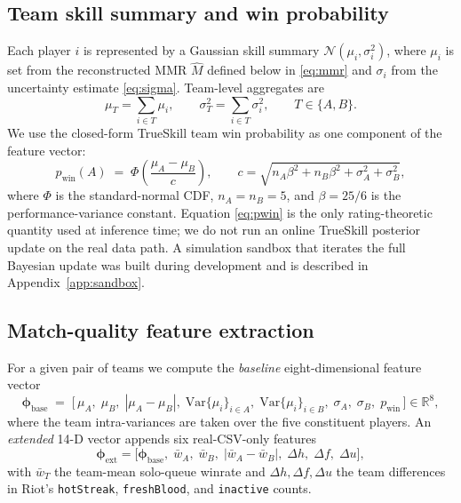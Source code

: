 \documentclass{article}
\begin{document}
\subsection{Team skill summary and win probability}
\label{sec:rating}
Each player $i$ is represented by a Gaussian skill summary $\mathcal{N}(\mu_i,
\sigma_i^2)$, where $\mu_i$ is set from the reconstructed MMR
$\widehat{M}$ defined below in \eqref{eq:mmr} and $\sigma_i$ from the
uncertainty estimate \eqref{eq:sigma}. Team-level aggregates are
\begin{equation}
\mu_T = \sum_{i \in T} \mu_i, \qquad
\sigma_T^2 = \sum_{i \in T} \sigma_i^2, \qquad T \in \{A, B\}.
\label{eq:team-agg}
\end{equation}
We use the closed-form TrueSkill team win probability as one component of
the feature vector:
\begin{equation}
p_{\text{win}}(A) \;=\; \Phi\!\left(\frac{\mu_A - \mu_B}{c}\right),
\qquad c = \sqrt{n_A \beta^2 + n_B \beta^2 + \sigma_A^2 + \sigma_B^2},
\label{eq:pwin}
\end{equation}
where $\Phi$ is the standard-normal CDF, $n_A = n_B = 5$, and $\beta = 25/6$
is the performance-variance constant. Equation \eqref{eq:pwin} is the only
rating-theoretic quantity used at inference time; we do not run an online
TrueSkill posterior update on the real data path. A simulation sandbox
that iterates the full Bayesian update was built during development and
is described in Appendix~\ref{app:sandbox}.

\subsection{Match-quality feature extraction}
\label{sec:features}
For a given pair of teams we compute the \emph{baseline} eight-dimensional
feature vector
\begin{equation}
\boldsymbol{\phi}_{\text{base}} \;=\;
\big[\,\mu_A,\; \mu_B,\; |\mu_A - \mu_B|,\;
\mathrm{Var}\{\mu_i\}_{i\in A},\; \mathrm{Var}\{\mu_i\}_{i\in B},\;
\sigma_A,\; \sigma_B,\; p_{\text{win}}\,\big] \in \mathbb{R}^8,
\label{eq:phi-base}
\end{equation}
where the team intra-variances are taken over the five constituent players.
An \emph{extended} 14-D vector appends six real-CSV-only features
\begin{equation}
\boldsymbol{\phi}_{\text{ext}} = \big[\boldsymbol{\phi}_{\text{base}},\;
\bar{w}_A,\; \bar{w}_B,\; |\bar{w}_A - \bar{w}_B|,\;
\Delta h,\; \Delta f,\; \Delta u\big],
\label{eq:phi-ext}
\end{equation}
with $\bar{w}_T$ the team-mean solo-queue winrate and
$\Delta h, \Delta f, \Delta u$ the team differences in Riot's
\texttt{hotStreak}, \texttt{freshBlood}, and \texttt{inactive} counts.
\end{document}
